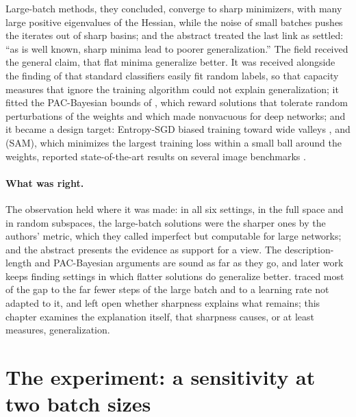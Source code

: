 \begin{refsection}
Large-batch methods, they concluded, converge to sharp minimizers, with many large positive eigenvalues of the Hessian, while the noise of small batches pushes the iterates out of sharp basins; and the abstract treated the last link as settled: ``as is well known, sharp minima lead to poorer generalization.'' The field received the general claim, that flat minima generalize better. It was received alongside the finding of \textcite{ZhangEtAl2017} that standard classifiers easily fit random labels, so that capacity measures that ignore the training algorithm could not explain generalization; it fitted the PAC-Bayesian bounds of \textcite{McAllester1999}, which reward solutions that tolerate random perturbations of the weights and which \textcite{DziugaiteRoy2017} made nonvacuous for deep networks; and it became a design target: Entropy-SGD biased training toward wide valleys \parencite{ChaudhariEtAl2017}, and  (SAM), which minimizes the largest training loss within a small ball around the weights, reported state-of-the-art results on several image benchmarks \parencite{ForetEtAl2021}.

\paragraph{What was right.} The observation held where it was made: in all six settings, in the full space and in random subspaces, the large-batch solutions were the sharper ones by the authors' metric, which they called imperfect but computable for large networks; and the abstract presents the evidence as support for a view. The description-length and PAC-Bayesian arguments are sound as far as they go, and later work keeps finding settings in which flatter solutions do generalize better.  traced most of the gap to the far fewer steps of the large batch and to a learning rate not adapted to it, and left open whether sharpness explains what remains; this chapter examines the explanation itself, that sharpness causes, or at least measures, generalization.

\section{The experiment: a sensitivity at two batch sizes}\label{sec:sharpness:experiment}


\end{refsection}
